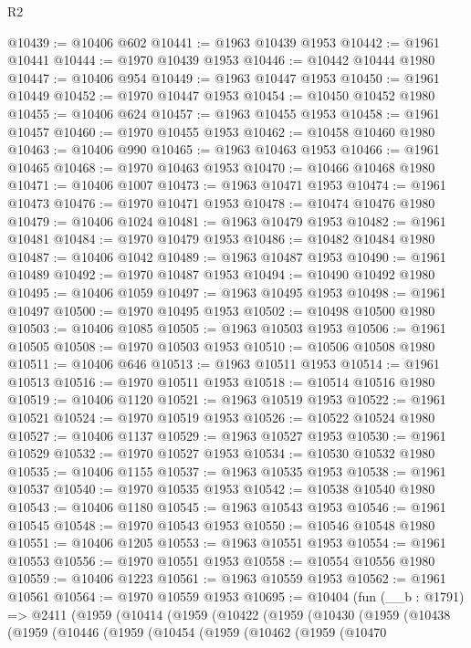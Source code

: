 \begin{lexlean}{R2}
\begin{coremodule}
@10439 := @10406 @602
@10441 := @1963 @10439 @1953
@10442 := @1961 @10441
@10444 := @1970 @10439 @1953
@10446 := @10442 @10444 @1980
@10447 := @10406 @954
@10449 := @1963 @10447 @1953
@10450 := @1961 @10449
@10452 := @1970 @10447 @1953
@10454 := @10450 @10452 @1980
@10455 := @10406 @624
@10457 := @1963 @10455 @1953
@10458 := @1961 @10457
@10460 := @1970 @10455 @1953
@10462 := @10458 @10460 @1980
@10463 := @10406 @990
@10465 := @1963 @10463 @1953
@10466 := @1961 @10465
@10468 := @1970 @10463 @1953
@10470 := @10466 @10468 @1980
@10471 := @10406 @1007
@10473 := @1963 @10471 @1953
@10474 := @1961 @10473
@10476 := @1970 @10471 @1953
@10478 := @10474 @10476 @1980
@10479 := @10406 @1024
@10481 := @1963 @10479 @1953
@10482 := @1961 @10481
@10484 := @1970 @10479 @1953
@10486 := @10482 @10484 @1980
@10487 := @10406 @1042
@10489 := @1963 @10487 @1953
@10490 := @1961 @10489
@10492 := @1970 @10487 @1953
@10494 := @10490 @10492 @1980
@10495 := @10406 @1059
@10497 := @1963 @10495 @1953
@10498 := @1961 @10497
@10500 := @1970 @10495 @1953
@10502 := @10498 @10500 @1980
@10503 := @10406 @1085
@10505 := @1963 @10503 @1953
@10506 := @1961 @10505
@10508 := @1970 @10503 @1953
@10510 := @10506 @10508 @1980
@10511 := @10406 @646
@10513 := @1963 @10511 @1953
@10514 := @1961 @10513
@10516 := @1970 @10511 @1953
@10518 := @10514 @10516 @1980
@10519 := @10406 @1120
@10521 := @1963 @10519 @1953
@10522 := @1961 @10521
@10524 := @1970 @10519 @1953
@10526 := @10522 @10524 @1980
@10527 := @10406 @1137
@10529 := @1963 @10527 @1953
@10530 := @1961 @10529
@10532 := @1970 @10527 @1953
@10534 := @10530 @10532 @1980
@10535 := @10406 @1155
@10537 := @1963 @10535 @1953
@10538 := @1961 @10537
@10540 := @1970 @10535 @1953
@10542 := @10538 @10540 @1980
@10543 := @10406 @1180
@10545 := @1963 @10543 @1953
@10546 := @1961 @10545
@10548 := @1970 @10543 @1953
@10550 := @10546 @10548 @1980
@10551 := @10406 @1205
@10553 := @1963 @10551 @1953
@10554 := @1961 @10553
@10556 := @1970 @10551 @1953
@10558 := @10554 @10556 @1980
@10559 := @10406 @1223
@10561 := @1963 @10559 @1953
@10562 := @1961 @10561
@10564 := @1970 @10559 @1953
@10695 := @10404
    (fun (__b : @1791) =>
    @2411
      (@1959
        (@10414
          (@1959
            (@10422
              (@1959
                (@10430
                  (@1959
                    (@10438
                      (@1959
                        (@10446
                          (@1959
                            (@10454
                              (@1959
                                (@10462
                                  (@1959
                                    (@10470

\end{coremodule}
\end{lexlean}
